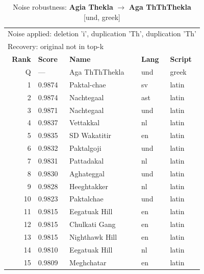 \begin{table}[htbp]
\centering
\small
\caption{Noise robustness: \textbf{Agia Thekla} $\rightarrow$ \textbf{Aga ThThThekla} [und, greek]}
\label{tab:noise-22}
\begin{tabular}{rllll}
\toprule
\multicolumn{5}{l}{\small Noise applied: deletion 'i', duplication 'Th', duplication 'Th'} \\
\multicolumn{5}{l}{\small Recovery: original not in top-k} \\
\midrule
\textbf{Rank} & \textbf{Score} & \textbf{Name} & \textbf{Lang} & \textbf{Script} \\
\midrule
\rowcolor{gray!20} Q & --- & Aga ThThThekla & und & greek \\
\midrule
1 & 0.9874 & Paktal-chae & sv & latin \\
2 & 0.9874 & Nachtegaal & ast & latin \\
3 & 0.9871 & Nachtegaal & und & latin \\
4 & 0.9837 & Vettakkal & nl & latin \\
5 & 0.9835 & SD Wakatitir & en & latin \\
6 & 0.9832 & Paktalgoji & und & latin \\
7 & 0.9831 & Pattadakal & nl & latin \\
8 & 0.9830 & Aghateggal & und & latin \\
9 & 0.9828 & Heeghtakker & nl & latin \\
10 & 0.9823 & Paktalchae & und & latin \\
11 & 0.9815 & Eegatuak Hill & en & latin \\
12 & 0.9815 & Chulkati Gang & en & latin \\
13 & 0.9815 & Nighthawk Hill & en & latin \\
14 & 0.9810 & Eegatuak Hill & nl & latin \\
15 & 0.9809 & Meghchatar & en & latin \\
\bottomrule
\end{tabular}
\end{table}

